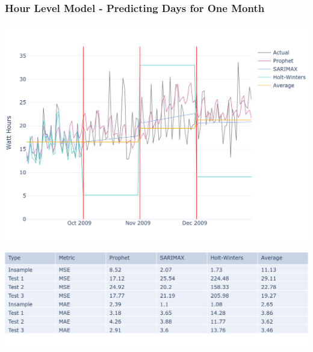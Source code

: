 \documentclass[10pt]{beamer}
\begin{document}
\begin{frame}
\frametitle{Hour Level Model - Predicting Days for One Month}

\bigskip
{
    \centering
    \includegraphics[width=\textwidth,height=\textheight,keepaspectratio]{model_comparison_timeseries_hourmodel_days.png}
    \par
}
\bigskip

\bigskip
{
    \centering
    \includegraphics[width=\textwidth,height=\textheight,keepaspectratio]{model_comparison_table_hourmodel_days.png}
    \par
}
\bigskip



\end{frame}
\end{document}
